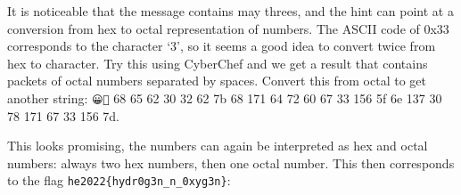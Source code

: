 It is noticeable that the message contains may threes, and the hint can point
at a conversion from hex to octal representation of numbers.  The ASCII code of
0x33 corresponds to the character `3', so it seems a good idea to convert twice
from hex to character.  Try this using CyberChef and we get a result that
contains packets of octal numbers separated by spaces.  Convert this from octal
to get another string: {\small\texttt{\NotoEmoji 😀🌊} 68 65 62 30 32 62 7b 68 171 64 72 60 67 33
156 5f 6e 137 30 78 171 67 33 156 7d}.

This looks promising, the numbers can again be interpreted as hex and octal
numbers: always two hex numbers, then one octal number.  This then corresponds
to the flag \verb+he2022{hydr0g3n_n_0xyg3n}+:


	









